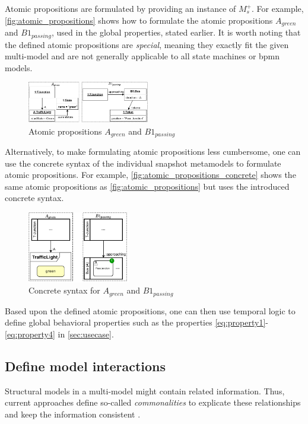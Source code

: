 \documentclass{jot}
\begin{document}
Atomic propositions are formulated by providing an instance of $M_s^+$.
For example, \autoref{fig:atomic_propositions} shows how to formulate the atomic propositions $A_{green}$ and $B1_{passing}$, used in the global properties, stated earlier.
It is worth noting that the defined atomic propositions are \textit{special}, meaning they exactly fit the given multi-model and are not generally applicable to all state machines or \gls*{bpmn} models.

\begin{figure}[h]
    \centering
    \includegraphics[width=0.475\textwidth]{figures/atomic_props.pdf}
    \caption{Atomic propositions $A_{green}$ and $B1_{passing}$}
    \label{fig:atomic_propositions}
\end{figure}

Alternatively, to make formulating atomic propositions less cumbersome, one can use the concrete syntax of the individual snapshot metamodels to formulate atomic propositions.
For example, \autoref{fig:atomic_propositions_concrete} shows the same atomic propositions as \autoref{fig:atomic_propositions} but uses the introduced concrete syntax.

\begin{figure}[h]
    \centering
    \includegraphics[width=0.4\textwidth]{figures/atomic_props_concrete.pdf}
    \caption{Concrete syntax for $A_{green}$ and $B1_{passing}$}
    \label{fig:atomic_propositions_concrete}
\end{figure}

Based upon the defined atomic propositions, one can then use temporal logic to define global behavioral properties such as the properties \ref{eq:property1}-\ref{eq:property4} in \autoref{sec:usecase}.

\subsection{Define model interactions}
Structural models in a multi-model might contain related information.
Thus, current approaches define so-called \emph{commonalities} to explicate these relationships and keep the information consistent \cite{stunkelComprehensiveSystemsFormal2021,klareCommonalitiesPreservingConsistency2019}.
\end{document}
